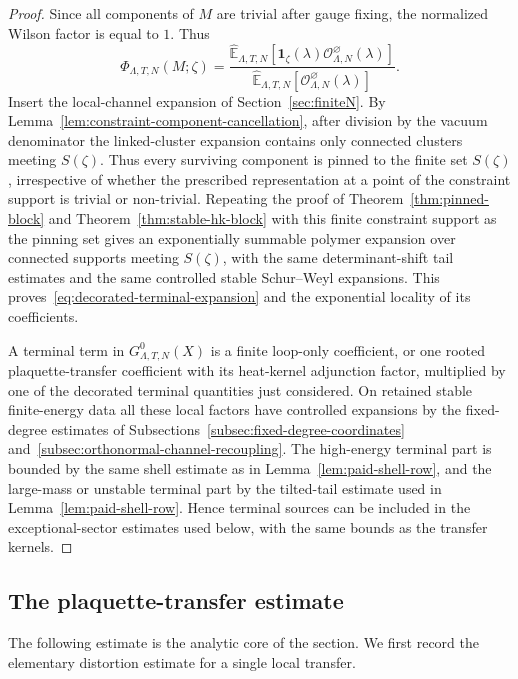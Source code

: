 \documentclass[11pt,a4paper,reqno]{amsart}
\theoremstyle{definition}
\theoremstyle{remark}
\newcommand\E{{\mathbb E}}
\begin{document}
\begin{proof}
Since all components of $M$ are trivial after gauge fixing, the normalized Wilson factor is equal to $1$. Thus
\[
\Phi_{\Lambda,T,N}(M;\zeta)
=
\frac{\widehat\E_{\Lambda,T,N}[\mathbf 1_\zeta(\lambda) \mathcal O^\varnothing_{\Lambda,N}(\lambda)]}
{\widehat\E_{\Lambda,T,N}[\mathcal O^\varnothing_{\Lambda,N}(\lambda)]}.
\]
Insert the local-channel expansion of Section~\ref{sec:finiteN}. By Lemma~\ref{lem:constraint-component-cancellation}, after division by the vacuum denominator the linked-cluster expansion contains only connected clusters meeting $S(\zeta)$. Thus every surviving component is pinned to the finite set $S(\zeta)$, irrespective of whether the prescribed representation at a point of the constraint support is trivial or non-trivial. Repeating the proof of Theorem~\ref{thm:pinned-block} and Theorem~\ref{thm:stable-hk-block} with this finite constraint support as the pinning set gives an exponentially summable polymer expansion over connected supports meeting $S(\zeta)$, with the same determinant-shift tail estimates and the same controlled stable Schur--Weyl expansions. This proves~\eqref{eq:decorated-terminal-expansion} and the exponential locality of its coefficients.

A terminal term in $G^0_{\Lambda,T,N}(X)$ is a finite loop-only coefficient, or one rooted plaquette-transfer coefficient with its heat-kernel adjunction factor, multiplied by one of the decorated terminal quantities just considered.  On retained stable finite-energy data all these local factors have controlled expansions by the fixed-degree estimates of Subsections~\ref{subsec:fixed-degree-coordinates} and~\ref{subsec:orthonormal-channel-recoupling}.  The high-energy terminal part is bounded by the same shell estimate as in Lemma~\ref{lem:paid-shell-row}, and the large-mass or unstable terminal part by the tilted-tail estimate used in Lemma~\ref{lem:paid-shell-row}.  Hence terminal sources can be included in the exceptional-sector estimates used below, with the same bounds as the transfer kernels.
\end{proof}

\subsection{The plaquette-transfer estimate}\label{subsec:plaquette-transfer-estimate}

The following estimate is the analytic core of the section. We first record the elementary distortion estimate for a single local transfer.
\end{document}
